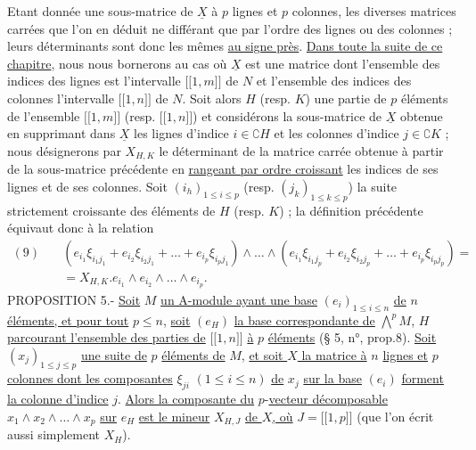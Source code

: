 Etant donnée une sous-matrice de $\underline X$ à $p$ lignes et $p$ colonnes, les diverses matrices carrées que l’on en déduit ne différant que par l’ordre des lignes ou des colonnes ; leurs déterminants sont donc les mêmes \uline{au signe près}. \uline{Dans toute la suite de ce chapitre}, nous nous bornerons au cas où $\underline X$ est une matrice dont l’ensemble des indices des lignes est l’intervalle $\lbrack\!\lbrack1,m\rbrack\!\rbrack$ de $N$ et l’ensemble des indices des colonnes l’intervalle $\lbrack\!\lbrack1,n\rbrack\!\rbrack$ de $N$. Soit alors $H$ (resp. $K$) une partie de $p$ éléments de l’ensemble $\lbrack\!\lbrack1,m\rbrack\!\rbrack$ (resp. $\lbrack\!\lbrack1,n\rbrack\!\rbrack$) et considérons la sous-matrice de $\underline X$ obtenue en supprimant dans $\underline X$ les lignes d’indice $i\in\complement H$ et les colonnes d’indice $j\in\complement K$ ; nous désignerons par $X_{H,K}$ le déterminant de la matrice carrée obtenue à partir de la sous-matrice précédente en \uline{rangeant par ordre croissant} les indices de ses lignes et de ses colonnes. Soit $(i_h)_{1\leq i\leq p}$ (resp. $(j_k)_{1\leq k\leq p}$) la suite strictement croissante des éléments de $H$ (resp. $K$) ; la définition précédente équivaut donc à la relation
\[
\begin{split}
(9)\quad &(e_{i_1}\xi_{i_1j_1}+e_{i_2}\xi_{i_2j_1}+\ldots+e_{i_p}\xi_{i_pj_1})\wedge\ldots\wedge(e_{i_1}\xi_{i_1j_p}+e_{i_2}\xi_{i_2j_p}+\ldots+e_{i_p}\xi_{i_pj_p})=\\
&=X_{H,K}.e_{i_1}\wedge e_{i_2}\wedge\ldots\wedge e_{i_p}.
\end{split}
\]
PROPOSITION 5.- \uline{Soit} $M$ \uline{un A-module ayant une base} $(e_i)_{1\leq i\leq n}$ \uline{de} $n$ \uline{éléments, et pour tout} $p\leq n$, \uline{soit} $(e_H)$ \uline{la base correspondante de} $\bigwedge^pM$, $H$ \uline{parcourant l’ensemble des parties de} $\lbrack\!\lbrack1,n\rbrack\!\rbrack$ \uline{à} $p$ \uline{éléments} (§ 5, n°, prop.8). \uline{Soit} $(x_j)_{1\leq j\leq p}$ \uline{une suite de} $p$ \uline{éléments de} $M$, \uline{et soit $X$ la matrice à} $n$ \uline{lignes et} $p$ \uline{colonnes dont les composantes} $\xi_{ji}$ $(1\leq i\leq n)$ \uline{de} $x_j$ \uline{sur la base} $(e_i)$ \uline{forment la colonne d’indice} $j$. \uline{Alors la composante du} $p$-\uline{vecteur décomposable} $x_1\wedge x_2\wedge\ldots\wedge x_p$ \uline{sur} $e_H$ \uline{est le mineur} $X_{H,J}$ \uline{de $X$, où} $J=\lbrack\!\lbrack1,p\rbrack\!\rbrack$ (que l’on écrit aussi simplement $X_H$).

